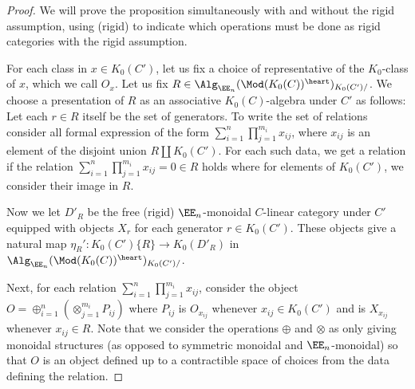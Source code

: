 \documentclass[12pt,oneside]{article}
\begin{document}
\begin{proof}
	We will prove the proposition simultaneously with and without the rigid assumption, using (rigid) to indicate which operations must be done as rigid categories with the rigid assumption.
	
	For each class in $x \in K_0(C')$, let us fix a choice of representative of the $K_0$-class of $x$, which we call $O_x$. Let us fix $R \in \Alg_{\EE_n}(\Mod(K_0(C))^{\heart})_{K_0(C')/}$. We choose a presentation of $R$ as an associative $K_0(C)$-algebra under $C'$ as follows:
	Let each $r \in R$ itself be the set of generators. To write the set of relations consider all formal expression of the form $\sum_{i=1}^n\prod_{j=1}^{m_i} x_{ij}$, where $x_{ij}$ is an element of the disjoint union $R\coprod K_0(C')$. For each such data, we get a relation if the relation $\sum_{i=1}^n\prod_{j=1}^{m_i} x_{ij}=0 \in R$ holds where for elements of $K_0(C')$, we consider their image in $R$.
	
	Now we let $D'_R$ be the free (rigid) $\EE_n$-monoidal $C$-linear category under $C'$ equipped with objects $X_{r}$ for each generator $r \in K_0(C')$. These objects give a natural map $\eta_{R}':K_0(C')\{R\} \to K_0(D'_R)$ in $\Alg_{\EE_n}(\Mod(K_0(C))^{\heart})_{K_0(C')/}$.
	
	Next, for each relation $\sum_{i=1}^n\prod_{j=1}^{m_i} x_{ij}$, consider the object $O = \oplus_{i=1}^n(\otimes_{j=1}^{m_i} P_{ij})$ where $P_{ij}$ is $O_{x_{ij}}$ whenever $x_{ij} \in K_0(C')$ and is $X_{x_{ij}}$ whenever $x_{ij} \in R$. Note that we consider the operations $\oplus$ and $\otimes$ as only giving monoidal structures (as opposed to symmetric monoidal and $\EE_n$-monoidal) so that $O$ is an object defined up to a contractible space of choices from the data defining the relation.


\end{proof}
\end{document}
